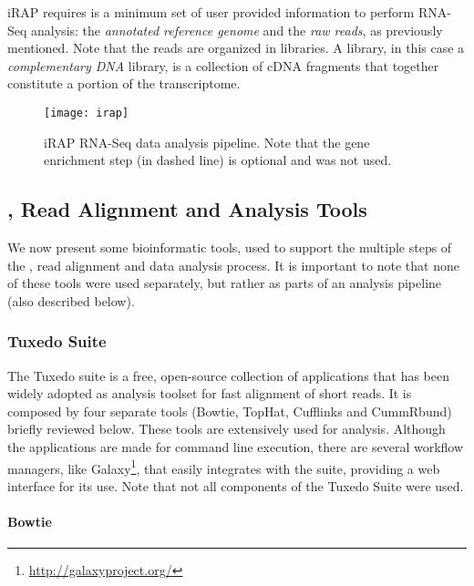 iRAP requires is a minimum set of user provided information to perform RNA-Seq
analysis: the \emph{annotated reference genome} and the \emph{raw reads}, as
previously mentioned. Note that the reads are organized in libraries. A library,
in this case a \emph{complementary DNA} library, is a collection of cDNA
fragments that together constitute a portion of the transcriptome.

\begin{figure}[!htb]
  \begin{center}
    \leavevmode
    \texttt{[image: irap]}
    \caption[iRAP RNA-Seq data analysis pipeline]{
      iRAP RNA-Seq data analysis pipeline. Note that the gene enrichment step
      (in dashed line) is optional and was not used.
    }
    \label{fig:irap}
  \end{center}
\end{figure}

\subsection{\rnaseq{}, Read Alignment and Analysis Tools}\label{sec:seqtools}

We now present some bioinformatic tools, used to support the multiple steps of
the \rnaseq{}, read alignment and data analysis process. It is important to note
that none of these tools were used separately, but rather as parts of an
analysis pipeline (also described below).

\subsubsection*{Tuxedo Suite}

The Tuxedo suite is a free, open-source collection of applications that has been
widely adopted as analysis toolset for fast alignment of short reads. It is
composed by four separate tools (Bowtie, TopHat, Cufflinks and CummRbund)
briefly reviewed below. These tools are extensively used for \rnaseq{} analysis.
Although the applications are made for command line execution, there are several
workflow managers, like Galaxy\footnote{\url{http://galaxyproject.org/}}, that
easily integrates with the suite, providing a web interface for its use. Note
that not all components of the Tuxedo Suite were used.

\paragraph{Bowtie}

